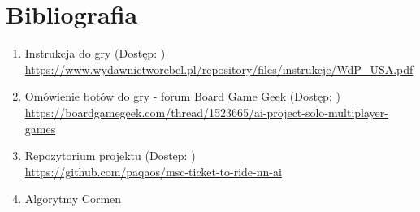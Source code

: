 \documentclass[12pt, oneside]{report}
\begin{document}
\chapter{Bibliografia}
\begin{enumerate}
	\item{Instrukcja do gry}
	\subitem (Dostęp: ) \\ \url{https://www.wydawnictworebel.pl/repository/files/instrukcje/WdP_USA.pdf}
	\item{Omówienie botów do gry - forum Board Game Geek}
	\subitem (Dostęp: ) \\ 
	\url{https://boardgamegeek.com/thread/1523665/ai-project-solo-multiplayer-games}
	\item{Repozytorium projektu}
	\subitem(Dostęp: ) \\ \url{https://github.com/paqaos/msc-ticket-to-ride-nn-ai}
	\item{Algorytmy}
	\subitem Cormen
\end{enumerate}
\listoffigures
\listoftables
\end{document}
